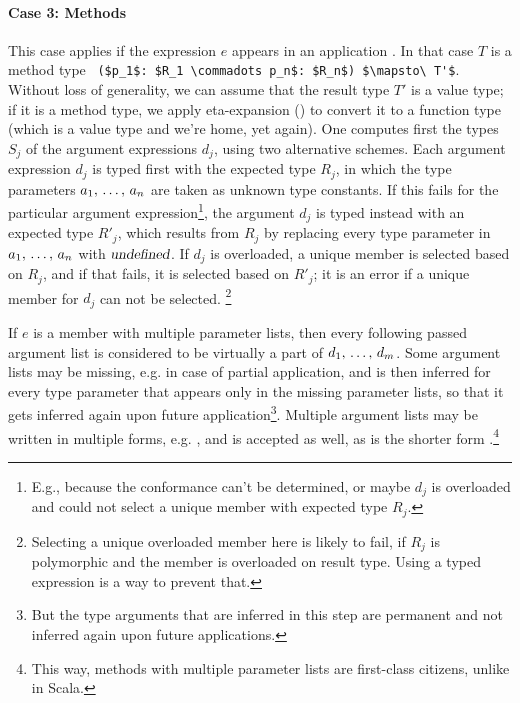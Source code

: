 \paragraph{Case 3: Methods}
This case applies if the expression $e$ appears in an application . In that case $T$ is a method type ~\lstinline!($p_1$: $R_1 \commadots p_n$: $R_n$) $\mapsto\ T'$!. Without loss of generality, we can assume that the result type $T'$ is a value type; if it is a method type, we apply eta-expansion () to convert it to a function type (which is a value type and we're home, yet again). One computes first the types $S_j$ of the argument expressions $d_j$, using two alternative schemes. Each argument expression $d_j$ is typed first with the expected type $R_j$, in which the type parameters $a_1 ,\, \ldots ,\, a_n$ are taken as unknown type constants. If this fails for the particular argument expression\footnote{E.g., because the conformance can't be determined, or maybe $d_j$ is overloaded and could not select a unique member with expected type $R_j$.}, the argument $d_j$ is typed instead with an expected type $R'_j$, which results from $R_j$ by replacing every type parameter in $a_1 ,\, \ldots ,\, a_n$ with $\mbox{\sl undefined}$. If $d_j$ is overloaded, a unique member is selected based on $R_j$, and if that fails, it is selected based on $R'_j$; it is an error if a unique member for $d_j$ can not be selected. \footnote{Selecting a unique overloaded member here is likely to fail, if $R_j$ is polymorphic and the member is overloaded on result type. Using a typed expression is a way to prevent that.}

If $e$ is a member with multiple parameter lists, then every following passed argument list is considered to be virtually a part of $d_1 ,\, \ldots ,\, d_m$. Some argument lists may be missing, e.g. in case of partial application, and  is then inferred for every type parameter that appears only in the missing parameter lists, so that it gets inferred again upon future application\footnote{But the type arguments that are inferred in this step are permanent and not inferred again upon future applications.}. Multiple argument lists may be written in multiple forms, e.g. , and  is accepted as well, as is the shorter form .\footnote{This way, methods with multiple parameter lists are first-class citizens, unlike in Scala.}

